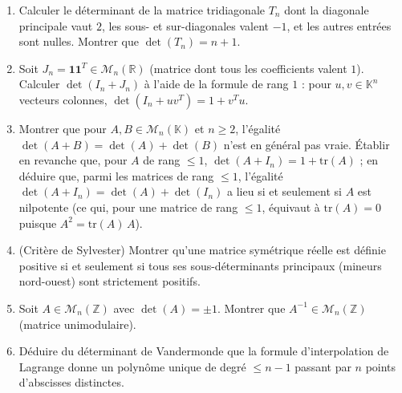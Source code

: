 \begin{mdframed}[style=exobar]
  \begin{enumerate}
    \item Calculer le déterminant de la matrice tridiagonale $T_n$
          dont la diagonale principale vaut $2$, les sous- et sur-diagonales
          valent $-1$, et les autres entrées sont nulles.
          Montrer que $\det(T_n) = n+1$.

    \item Soit $J_n = \mathbf{1}\mathbf{1}^T \in \mathcal{M}_n(\mathbb{R})$
          (matrice dont tous les coefficients valent $1$).
          Calculer $\det(I_n + J_n)$ à l'aide de la formule de rang $1$ :
          pour $u,v \in \mathbb{K}^n$ vecteurs colonnes,
          $\det(I_n + uv^T) = 1 + v^Tu$.

    \item Montrer que pour $A,B \in \mathcal{M}_n(\mathbb{K})$ et $n\geq 2$,
          l'égalité $\det(A+B) = \det(A) + \det(B)$ n'est en général pas vraie.
          Établir en revanche que, pour $A$ de rang $\leq 1$,
          $\det(A+I_n) = 1 + \mathrm{tr}(A)$ ;
          en déduire que, parmi les matrices de rang $\leq 1$, l'égalité
          $\det(A+I_n) = \det(A) + \det(I_n)$ a lieu si et seulement si
          $A$ est nilpotente (ce qui, pour une matrice de rang $\leq 1$,
          équivaut à $\mathrm{tr}(A) = 0$ puisque $A^2 = \mathrm{tr}(A)\,A$).

    \item (Critère de Sylvester) Montrer qu'une matrice symétrique réelle
          est définie positive si et seulement si tous ses sous-déterminants
          principaux (mineurs nord-ouest) sont strictement positifs.

    \item Soit $A \in \mathcal{M}_n(\mathbb{Z})$ avec $\det(A) = \pm 1$.
          Montrer que $A^{-1} \in \mathcal{M}_n(\mathbb{Z})$
          (matrice unimodulaire).

    \item Déduire du déterminant de Vandermonde que la formule d'interpolation
          de Lagrange donne un polynôme unique de degré $\leq n-1$ passant
          par $n$ points d'abscisses distinctes.
  \end{enumerate}
\end{mdframed}

